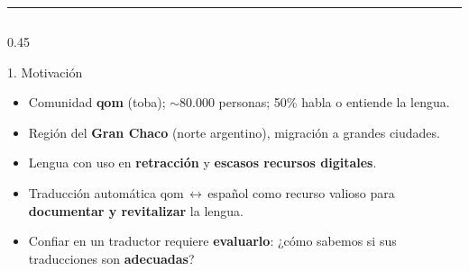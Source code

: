 \documentclass[final]{beamer}
\begin{document}
\begin{frame}[t]
\vspace{1cm}
{\color{tudBorder}\rule{\linewidth}{3pt}}
\vspace{-2cm}

\begin{columns}[t,onlytextwidth]

\begin{column}{0.45\textwidth}

  \begin{pblock}{1. Motivación}
    \begin{itemize}
      \item Comunidad \textbf{qom} (toba); $\sim$80.000 personas; 50\% habla o entiende la lengua.
      \item Región del \textbf{Gran Chaco} (norte argentino), migración a
            grandes ciudades.
      \item Lengua con uso en \textbf{retracción} y \textbf{escasos recursos digitales}.
      \item Traducción automática qom\,$\leftrightarrow$\,español como recurso valioso para \textbf{documentar y revitalizar} la lengua.
      \item Confiar en un traductor requiere \textbf{evaluarlo}: ¿cómo sabemos si sus traducciones son \textbf{adecuadas}?
    \end{itemize}
  \end{pblock}
  

\end{column}
\end{columns}
\end{frame}
\end{document}
